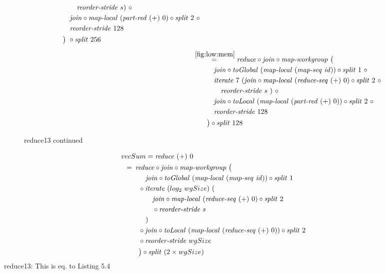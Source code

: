 \begin{figure*}[t]
\begin{align*}
\begin{aligned}
    &\qquad\qquad \reorderStride\ s)\ \circ\\
    &\qquad\quad\join \circ \mapLocal\ (\partRed\ (+)\ 0) \circ \splitN\ 2\ \circ\\
    &\qquad\quad\reorderStride\ 128\\
    &\qquad\big)\ \circ \splitN\ 256
  \end{aligned}\\[.5em]
%
  &\hspace{-2em}\quad\begin{aligned}
    &\overset{\ref{fig:low:mem}}{=\hspace{.2em}}
      \reduce \circ \join \circ \mapWorkgroup\ \big(\\
    &\qquad\quad\join \circ \toGlobal\ (\mapLocal\ (\mapSeq\ \id)) \circ \splitN\ 1\ \circ\\
    &\qquad\quad\iterateN\ 7\ (\join \circ \mapLocal\ (\reduceSeq\ (+)\ 0) \circ \splitN\ 2\ \circ\\
    &\qquad\qquad \reorderStride\ s\ )\ \circ\\
    &\qquad\quad\join \circ \toLocal\ (\mapLocal\ (\partRed\ (+)\ 0)) \circ \splitN\ 2\ \circ\\
    &\qquad\quad\reorderStride\ 128\\
    &\qquad\big) \circ \splitN\ 128
  \end{aligned}
%  
\end{align*}
\caption{reduce13 continued}
\end{figure*}

\begin{align}
  &\hspace{-1.5em}vecSum = \reduce\ (+)\ 0\nonumber\\
  &\hspace{-2em}\quad\begin{aligned}
    &=\hspace{.2em}
      \reduce \circ \join \circ \mapWorkgroup\ \big(\\
      &\qquad\quad \join \circ \toGlobal\ (\mapLocal\ (\mapSeq\ \id)) \circ \splitN\ 1\\
      &\qquad \circ \iterateN\ (log_2\ wgSize)\ (\\
      &\qquad\qquad \join \circ \mapLocal\ (\reduceSeq\ (+)\ 0) \circ \splitN\ 2\\
      &\qquad\qquad \circ \reorderStride\ s\\
      &\qquad\quad)\\
      &\qquad \circ \join \circ \toLocal\ (\mapLocal\ (\reduceSeq\ (+)\ 0)) \circ \splitN\ 2\\
      &\qquad \circ \reorderStride\ wgSize\\
      &\qquad\big) \circ \splitN\ (2\times wgSize)
  \end{aligned}
\end{align}
reduce13: This is eq. to Listing 5.4









